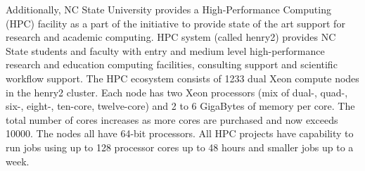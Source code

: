 Additionally, NC State University provides a High-Performance Computing (HPC) facility as a part of the initiative to provide state of the art support for research and academic computing. HPC system (called henry2) provides NC State students and faculty with entry and medium level high-performance research and education computing facilities, consulting support and scientific workflow support. The HPC ecosystem consists of 1233 dual Xeon compute nodes in the henry2 cluster. Each node has two Xeon processors (mix of dual-, quad-, six-, eight-, ten-core, twelve-core) and 2 to 6 GigaBytes of memory per core. The total number of cores increases as more cores are purchased and now exceeds 10000. The nodes all have 64-bit processors. All HPC projects have capability to run jobs using up to 128 processor cores up to 48 hours and smaller jobs up to a week.


 

